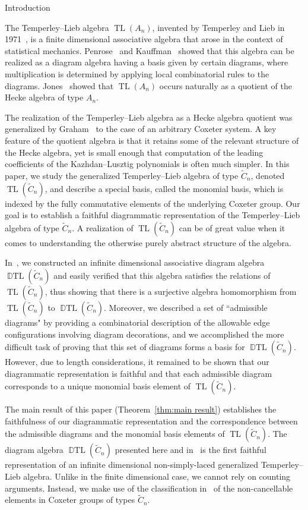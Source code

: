 \documentclass[11pt]{amsart}
\theoremstyle{definition}
\numberwithin{equation}{section}
\newcommand{\C}{\widetilde{C}}
\DeclareMathOperator{\TL}{TL}
\DeclareMathOperator{\DTL}{\mathbb{D}TL}
\renewcommand{\(}{\left(}
\renewcommand{\)}{\right)}
\begin{document}
\begin{section}{Introduction}\label{sec:intro}

The Temperley--Lieb algebra $\TL(A_n)$, invented by Temperley and Lieb in 1971~\cite{Temperley1971}, is a finite dimensional associative algebra that arose in the context of statistical mechanics.  Penrose~\cite{Penrose1971} and Kauffman~\cite{Kauffman1987} showed that this algebra can be realized as a diagram algebra having a basis given by certain diagrams, where multiplication is determined by applying local combinatorial rules to the diagrams. Jones~\cite{Jones1999} showed that $\TL(A_n)$ occurs naturally as a quotient of the Hecke algebra of type $A_n$.  

The realization of the Temperley--Lieb algebra as a Hecke algebra quotient was generalized by Graham~\cite{Graham1995} to the case of an arbitrary Coxeter system. A key feature of the quotient algebra is that it retains some of the relevant structure of the Hecke algebra, yet is small enough that computation of the leading coefficients of the Kazhdan--Lusztig polynomials is often much simpler. In this paper, we study the generalized Temperley--Lieb algebra of type $\C_{n}$, denoted $\TL(\C_{n})$, and describe a special basis, called the monomial basis, which is indexed by the fully commutative elements  of the underlying Coxeter group. Our goal is to establish a faithful diagrammatic representation of the Temperley--Lieb algebra of type $\C_n$.  A realization of $\TL(\C_n)$ can be of great value when it comes to understanding the otherwise purely abstract structure of the algebra.

In~\cite{Ernst2012}, we constructed an infinite dimensional associative diagram algebra $\DTL(\C_n)$ and easily verified that this algebra satisfies the relations of $\TL(\C_n)$, thus showing that there is a surjective algebra homomorphism from $\TL(\C_n)$ to $\DTL(\C_n)$.  Moreover, we described a set of ``admissible diagrams" by providing a combinatorial description of the allowable edge configurations involving diagram decorations, and we accomplished the more difficult task of proving that this set of diagrams forms a basis for $\DTL(\C_n)$.  However, due to length considerations, it remained to be shown that our diagrammatic representation is faithful and that each admissible diagram corresponds to a unique monomial basis element of $\TL(\C_n)$.  

The main result of this paper (Theorem~\ref{thm:main result}) establishes the faithfulness of our diagrammatic representation and the correspondence between the admissible diagrams and the monomial basis elements of $\TL(\C_n)$.  The diagram algebra $\DTL(\C_n)$ presented here and in~\cite{Ernst2012} is the first faithful representation of an infinite dimensional non-simply-laced generalized Temperley--Lieb algebra. Unlike in the finite dimensional case, we cannot rely on counting arguments.  Instead, we make use of the classification in~\cite{Ernst2010} of the non-cancellable elements in Coxeter groups of types $\C_n$.


\end{section}
\end{document}
